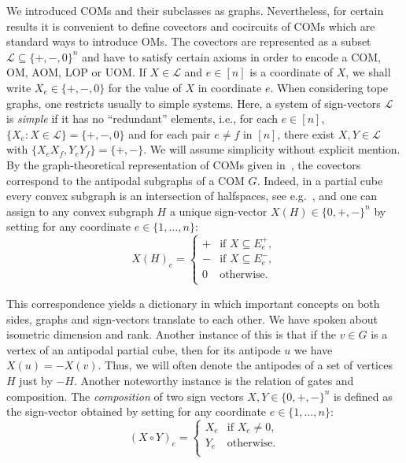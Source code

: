 \documentclass[final,11pt]{article}
\newcommand{\covectors}{\ensuremath{\mathcal{L}}}
\begin{document}
We introduced COMs and their subclasses as graphs. Nevertheless, for certain results it is convenient to define covectors and cocircuits of COMs which are standard ways to introduce OMs. 
 The covectors are represented as a subset $\covectors\subseteq \{+,-,0\}^n$ and have to satisfy certain axioms in order to encode a COM, OM, AOM, LOP or UOM. If $X \in \covectors$ and $e \in [n]$ is a coordinate of $X$, we shall write $X_e \in \{+, -, 0\}$ for the value of $X$ in coordinate $e$.
When considering tope graphs, one restricts usually to simple systems. Here, a system of sign-vectors $\covectors$ is \emph{simple} if it has no ``redundant'' elements, i.e., for each $e \in [n]$,  $\{X_e: X\in \covectors\}=\{+, -,0 \}$ and for each pair $e\neq f$ in $[n]$,  there exist $X,Y \in \covectors$ with $\{X_eX_f,Y_eY_f\}=\{+, -\}$. We will assume simplicity without explicit mention.  By the graph-theoretical representation of COMs given in~\cite{Kna-17}, the covectors correspond to the antipodal subgraphs of a COM $G$. Indeed, in a partial cube every convex subgraph is an intersection of halfspaces, see e.g.~\cite{Alb-16}, and one can assign to any convex subgraph $H$ a unique sign-vector $X(H)\in\{0,+,-
\}^n$ by setting for any coordinate $e\in\{1,\ldots, n\}$: $$X(H)_e=\begin{cases}
                                   + & \text{if }X\subseteq E_e^+,\\ 
                                   - & \text{if }X\subseteq E_e^-,\\
                                   0 & \text{otherwise.}\\
                                  \end{cases}$$

This correspondence yields a dictionary in which important concepts on both sides, graphs and sign-vectors translate to each other. We have spoken about isometric dimension and rank. Another instance of this is that if the $v\in G$ is a vertex of an antipodal partial cube, then for its antipode $u$ we have $X(u)=-X(v)$. Thus, we will often denote the antipodes of a set of vertices $H$ just by $-H$. Another noteworthy instance is the relation of gates and composition. The \emph{composition} of two sign vectors $X,Y\in\{0,+,-
\}^n$ is defined as the sign-vector obtained by setting for any coordinate $e\in\{1,\ldots, n\}$: $$(X\circ Y)_e=\begin{cases}                                   X_e & \text{if }X_e\neq 0,\\ 
Y_e & \text{otherwise.}\\                                  \end{cases}$$
\end{document}
